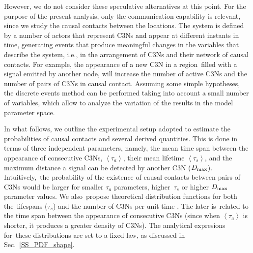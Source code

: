 \documentclass[crop]{CSLB}
\newcommand{\ceti}{C3N}
\newcommand{\cetis}{C3Ns}
\begin{document}
%
However, we do not consider these speculative alternatives at this point.
%
For the purpose of the present analysis, only the communication capability is
relevant, since we study the causal contacts between the locations.
%
The system is defined by a number of actors that represent \cetis{} and appear
at different instants in time, generating events that produce meaningful
changes in the variables that describe the system, i.e., in the arrangement of
\cetis{} and their network of causal contacts.
%
For example, the appearance of a new \ceti{} in a region filled with a signal
emitted by another node, will increase the number of active \cetis{} and the
number of pairs of \cetis{} in causal contact.
%
Assuming some simple hypotheses, the discrete events method can be performed
taking into account a small number of variables, which allow to analyze the
variation of the results in the model parameter space.




In what follows, we outline the experimental setup adopted to estimate the
probabilities of causal contacts and several derived quantities.
%
This is done in terms of three independent parameters, namely, the mean time
span between the appearance of consecutive \cetis{}, $\left<\tau_a\right>$,
their mean lifetime $\left<\tau_s\right>$, and the maximum distance a signal
can be detected by another \ceti{} ($D_{\rm max}$).
%
Intuitively, the probability of the existence of causal contacts between pairs
of \cetis{} would be larger for smaller $\tau_a$ parameters, higher $\tau_s$ or
higher $D_{\rm max}$ parameter values.
%
We also propose theoretical distribution functions for both the lifespans
($\tau_s$) and the number of \cetis{} per unit time
\citep{maccone_evolution_2014, Sotos_biotechnology_2019}.
%
The later is related to the time span between the appearance of consecutive
\cetis{} (since when $\left<\tau_a\right>$ is shorter, it produces a greater
density of \cetis{}).
%
The analytical expresions for these distributions are set to a fixed law, as
discussed in Sec.~\ref{SS_PDF_shape}.  
    
     
\end{document}
